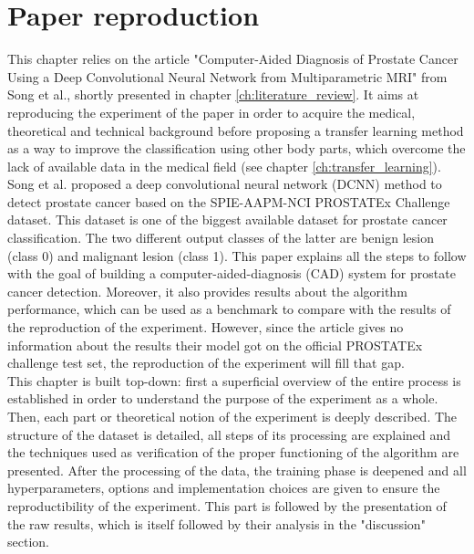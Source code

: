
\chapter{Paper reproduction}
\label{ch:paper_reproduction}
This chapter relies on the article "Computer-Aided Diagnosis of Prostate Cancer Using a Deep Convolutional Neural Network from Multiparametric MRI" from Song et al.\cite{07}, shortly presented in chapter \ref{ch:literature_review}. It aims at reproducing the experiment of the paper in order to acquire the medical, theoretical and technical background before proposing a transfer learning method as a way to improve the classification using other body parts, which overcome the lack of available data in the medical field (see chapter \ref{ch:transfer_learning}).\\
Song et al. \cite{07} proposed a deep convolutional neural network (DCNN) method to detect prostate cancer based on the SPIE-AAPM-NCI PROSTATEx Challenge dataset. This dataset is one of the biggest available dataset for prostate cancer classification. The two different output classes of the latter are benign lesion (class 0) and malignant lesion (class 1). This paper explains all the steps to follow with the goal of building a computer-aided-diagnosis (CAD) system for prostate cancer detection. Moreover, it also provides results about the algorithm performance, which can be used as a benchmark to compare with the results of the reproduction of the experiment. However, since the article gives no information about the results their model got on the official PROSTATEx challenge test set, the reproduction of the experiment will fill that gap.\\
This chapter is built top-down: first a superficial overview of the entire process is established in order to understand the purpose of the experiment as a whole. Then, each part or theoretical notion of the experiment is deeply described. The structure of the dataset is detailed, all steps of its processing are explained and the techniques used as verification of the proper functioning of the algorithm are presented. After the processing of the data, the training phase is deepened and all hyperparameters, options and implementation choices are given to ensure the reproductibility of the experiment. This part is followed by the presentation of the raw results, which is itself followed by their analysis in the "discussion" section.

